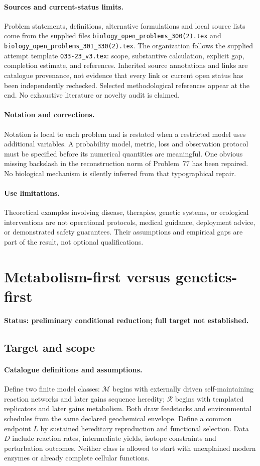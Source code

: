 \documentclass[11pt]{article}
\begin{document}
\paragraph{Sources and current-status limits.}
Problem statements, definitions, alternative formulations and local source lists
come from the supplied files
\texttt{biology\_open\_problems\_300(2).tex} and
\texttt{biology\_open\_problems\_301\_330(2).tex}.
The organization follows the supplied attempt template
\texttt{O33-23\_v3.tex}: scope, substantive calculation, explicit gap,
completion estimate, and references. Inherited source annotations and links are
catalogue provenance, not evidence that every link or current open status has
been independently rechecked. Selected methodological references appear at the
end. No exhaustive literature or novelty audit is claimed.

\paragraph{Notation and corrections.}
Notation is local to each problem and is restated when a restricted model uses
additional variables. A probability model, metric, loss and observation protocol
must be specified before its numerical quantities are meaningful. One obvious
missing backslash in the reconstruction norm of Problem~77 has been repaired.
No biological mechanism is silently inferred from that typographical repair.

\paragraph{Use limitations.}
Theoretical examples involving disease, therapies, genetic systems, or ecological
interventions are not operational protocols, medical guidance, deployment advice,
or demonstrated safety guarantees. Their assumptions and empirical gaps are part
of the result, not optional qualifications.


\section*{Metabolism-first versus genetics-first}
\label{prob:291}
\noindent\textbf{Status: preliminary conditional reduction; full target not established.}
\subsection{Target and scope}
\paragraph{Catalogue definitions and assumptions.}
Define two finite model classes: $\mathcal M$ begins with externally driven self-maintaining reaction networks and later gains sequence heredity; $\mathcal R$ begins with templated replicators and later gains metabolism. Both draw feedstocks and environmental schedules from the same declared geochemical envelope. Define a common endpoint $L$ by sustained hereditary reproduction and functional selection. Data $D$ include reaction rates, intermediate yields, isotope constraints and perturbation outcomes. Neither class is allowed to start with unexplained modern enzymes or already complete cellular functions.
\end{document}
